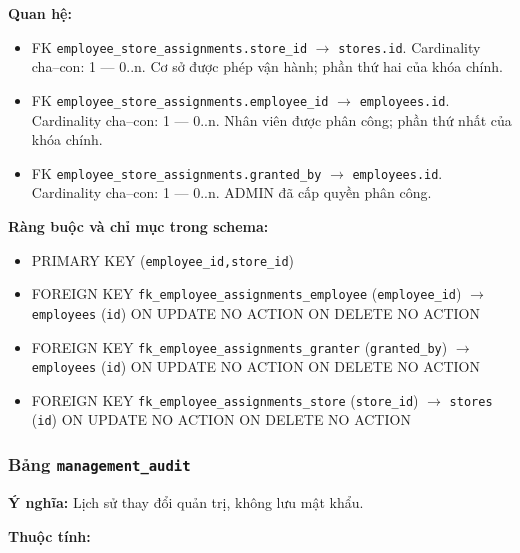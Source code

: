 \textbf{Quan hệ:}

\begin{itemize}

\item FK \texttt{employee\_store\_assignments.store\_id} $\rightarrow$ \texttt{stores.id}. Cardinality cha--con: 1 — 0..n. Cơ sở được phép vận hành; phần thứ hai của khóa chính.

\item FK \texttt{employee\_store\_assignments.employee\_id} $\rightarrow$ \texttt{employees.id}. Cardinality cha--con: 1 — 0..n. Nhân viên được phân công; phần thứ nhất của khóa chính.

\item FK \texttt{employee\_store\_assignments.granted\_by} $\rightarrow$ \texttt{employees.id}. Cardinality cha--con: 1 — 0..n. ADMIN đã cấp quyền phân công.

\end{itemize}

\textbf{Ràng buộc và chỉ mục trong schema:}

\begin{itemize}

\item PRIMARY KEY (\texttt{employee\_id,store\_id})

\item FOREIGN KEY \texttt{fk\_employee\_assignments\_employee} (\texttt{employee\_id}) $\rightarrow$ \texttt{employees} (\texttt{id}) ON UPDATE NO ACTION ON DELETE NO ACTION

\item FOREIGN KEY \texttt{fk\_employee\_assignments\_granter} (\texttt{granted\_by}) $\rightarrow$ \texttt{employees} (\texttt{id}) ON UPDATE NO ACTION ON DELETE NO ACTION

\item FOREIGN KEY \texttt{fk\_employee\_assignments\_store} (\texttt{store\_id}) $\rightarrow$ \texttt{stores} (\texttt{id}) ON UPDATE NO ACTION ON DELETE NO ACTION

\end{itemize}

\subsubsection{Bảng \texttt{management\_audit}}

\textbf{Ý nghĩa:} Lịch sử thay đổi quản trị, không lưu mật khẩu.\par

\textbf{Thuộc tính:}

